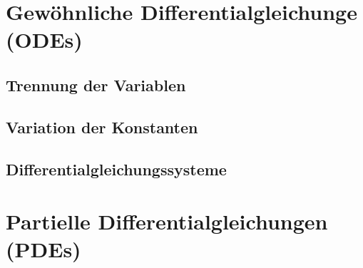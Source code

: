 \section{Gewöhnliche Differentialgleichunge (ODEs)}

\subsection{Trennung der Variablen}

\subsection{Variation der Konstanten}

\subsection{Differentialgleichungssysteme}

\section{Partielle Differentialgleichungen (PDEs)}